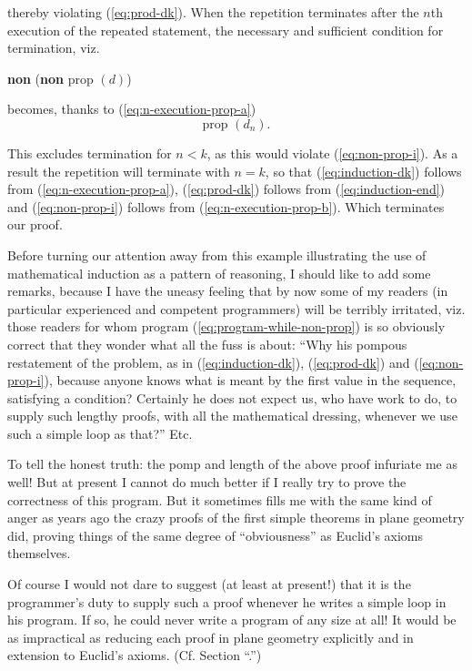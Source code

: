 \noindent 
thereby violating (\ref{eq:prod-dk}). When the repetition terminates after the $n$th execution of the repeated statement, the necessary and sufficient condition for termination, viz.
\begin{center}
	\textbf{non} (\textbf{non} prop $(d)$)
\end{center}

\noindent
becomes, thanks to (\ref{eq:n-execution-prop-a})
\begin{equation}
	\label{eq:induction-end}
	\text{prop } (d_n).
\end{equation}

This excludes termination for $n < k$, as this would violate (\ref{eq:non-prop-i}). As a result the repetition will terminate with $n = k$, so that (\ref{eq:induction-dk}) follows from (\ref{eq:n-execution-prop-a}), (\ref{eq:prod-dk}) follows from (\ref{eq:induction-end}) and (\ref{eq:non-prop-i}) follows from (\ref{eq:n-execution-prop-b}). Which terminates our proof.

Before turning our attention away from this example illustrating the use of mathematical induction as a pattern of reasoning, I should like to add some remarks, because I have the uneasy feeling that by now some of my readers (in particular experienced and competent programmers) will be terribly irritated, viz. those readers for whom program (\ref{eq:program-while-non-prop}) is so obviously correct that they wonder what all the fuss is about: ``Why his pompous restatement of the problem, as in (\ref{eq:induction-dk}), (\ref{eq:prod-dk}) and (\ref{eq:non-prop-i}), because anyone knows what is meant by the first value in the sequence, satisfying a condition? Certainly he does not expect us, who have work to do, to supply such lengthy proofs, with all the mathematical dressing, whenever we use such a simple loop as that?'' Etc.

To tell the honest truth: the pomp and length of the above proof infuriate me as well! But at present I cannot do much better if I really try to prove the correctness of this program. But it sometimes fills me with the same kind of anger as years ago the crazy proofs of the first simple theorems in plane geometry did, proving things of the same degree of ``obviousness'' as Euclid's axioms themselves.

Of course I would not dare to suggest (at least at present!) that it is the programmer's duty to supply such a proof whenever he writes a simple loop in his program. If so, he could never write a program of any size at all! It would be as impractical as reducing each proof in plane geometry explicitly and in extension to Euclid's axioms. (Cf. Section ``.'')

